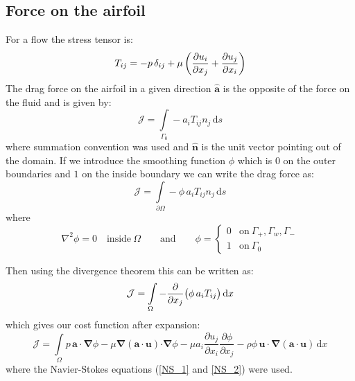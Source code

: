 \documentclass[12pt, a4paper]{article}
\begin{document}
	\subsection{Force on the airfoil}
		For a flow the stress tensor is:
		\begin{equation} \label{stress_tensor}
			T_{ij} = -p \, \delta_{ij} +
			 \mu \, \bigg{(}\frac{\partial u_i}{\partial x_j} + \frac{\partial u_j}{\partial x_i} \bigg{)}
		\end{equation}
		The drag force on the airfoil in a given direction $\mathbf{\hat{a}}$ is the opposite of the force on the fluid and is given by:
		\begin{equation} \label{direct_force}
			\mathcal{J} = \int\limits_{\Gamma_0} -a_i T_{ij} n_j \, \mathrm{d}s
		\end{equation}
		where summation convention was used and $\mathbf{\hat{n}}$ is the unit vector pointing out of the domain. If we introduce the smoothing function $\phi$ which is $0$ on the outer boundaries and $1$ on the inside boundary we can write the drag force as:
		\begin{equation} \label{direct_force_phi}
			\mathcal{J} = \int\limits_{\partial \Omega} - \phi \, a_i T_{ij} n_j \, \mathrm{d}s
		\end{equation}
		where
		\begin{equation} \label{phi_definition}
			\nabla^2 \phi = 0 \quad \text{inside}\ \Omega
			\qquad \text{and} \qquad
			\phi = \begin{cases}
				0	 &	\text{on}\ \Gamma_+, \Gamma_w, \Gamma_- \\
				1	 &	\text{on}\ \Gamma_0
			\end{cases}
		\end{equation}
        
		Then using the divergence theorem this can be written as:
		\begin{equation} \label{force_divergence}
			\mathcal{J} = \int\limits_{\Omega} - \frac{\partial}{\partial x_j}\big{(}\phi \, a_i T_{ij} \big{)} \, \mathrm{d}x
		\end{equation}
		which gives our cost function after expansion:
		\begin{equation} \label{cost_function}
			\mathcal{J} = \int\limits_{\Omega}{{p\, \mathbf{a \cdot} \boldsymbol{\nabla} \phi} -
			{\mu \boldsymbol{\nabla}(\mathbf{a \cdot u}) \mathbf{\cdot} \boldsymbol{\nabla} \phi} - 
			{\mu a_i \frac{\partial u_j}{\partial x_i} \frac{\partial \phi}{\partial x_j}} - 
			{\rho \phi \, \mathbf{u \cdot} \boldsymbol{\nabla}(\mathbf{a \cdot u})}
			\,  \mathrm{d}x}
		\end{equation}
		where the Navier-Stokes equations (\ref{NS_1} and \ref{NS_2}) were used.
        
\end{document}
